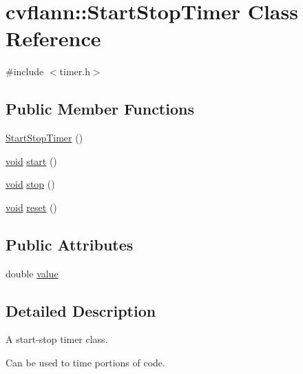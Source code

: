 \hypertarget{classcvflann_1_1StartStopTimer}{\section{cvflann\-:\-:Start\-Stop\-Timer Class Reference}
\label{classcvflann_1_1StartStopTimer}
}


{\ttfamily \#include $<$timer.\-h$>$}

\subsection*{Public Member Functions}
\begin{DoxyCompactItemize}
\item 
\hyperlink{classcvflann_1_1StartStopTimer_a01c3dd95d1d3bf2234d61171871e9391}{Start\-Stop\-Timer} ()
\item 
\hyperlink{legacy_8hpp_a8bb47f092d473522721002c86c13b94e}{void} \hyperlink{classcvflann_1_1StartStopTimer_abef9e74190be725316f45a082a384f61}{start} ()
\item 
\hyperlink{legacy_8hpp_a8bb47f092d473522721002c86c13b94e}{void} \hyperlink{classcvflann_1_1StartStopTimer_a57063682a9b200f92069d29ddc329190}{stop} ()
\item 
\hyperlink{legacy_8hpp_a8bb47f092d473522721002c86c13b94e}{void} \hyperlink{classcvflann_1_1StartStopTimer_a1e3085cbb2acacd48424fcabcb01537d}{reset} ()
\end{DoxyCompactItemize}
\subsection*{Public Attributes}
\begin{DoxyCompactItemize}
\item 
double \hyperlink{classcvflann_1_1StartStopTimer_a321ea0ef606a33880596f8ac95121779}{value}
\end{DoxyCompactItemize}


\subsection{Detailed Description}
A start-\/stop timer class.

Can be used to time portions of code. 

